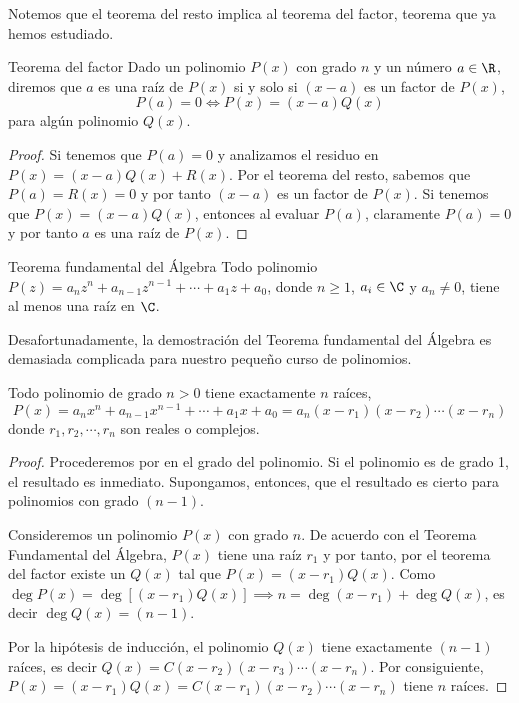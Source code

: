 Notemos que el teorema del resto implica al teorema del factor, teorema que ya hemos estudiado.

\begin{theorem.tcb}{Teorema del factor}{}
    Dado un polinomio $P(x)$ con grado $n$ y un número $a \in \R$, diremos que $a$ es una raíz de $P(x)$ si y solo si $(x - a)$ es un factor de $P(x)$, \ie
    \[
        P(a) = 0 \iff P(x) = (x - a)Q(x)
    \]
    para algún polinomio $Q(x)$.
\end{theorem.tcb}
\begin{proof}
    Si tenemos que $P(a) = 0$ y analizamos el residuo en $P(x) = (x - a)Q(x) + R(x)$.
    Por el teorema del resto, sabemos que $P(a) = R(x) = 0$ y por tanto $(x - a)$ es un factor de $P(x)$.
    Si tenemos que $P(x) = (x - a)Q(x)$, entonces al evaluar $P(a)$, claramente $P(a) = 0$ y por tanto $a$ es una raíz de $P(x)$.
\end{proof}

\begin{theorem.tcb}{Teorema fundamental del Álgebra}{}
    Todo polinomio $P(z) = a_n z^n + a_{n - 1} z^{n - 1} + \cdots + a_1 z + a_0$, donde $n \geq 1$, $a_i \in \C$ y $a_n \neq 0$, tiene al menos una raíz en $\C$.
\end{theorem.tcb}

Desafortunadamente, la demostración del Teorema fundamental del Álgebra es demasiada complicada para nuestro pequeño curso de polinomios.

\begin{theorem.tcb}{}{}
    Todo polinomio de grado $n > 0$ tiene exactamente $n$ raíces, \ie
    \[
        P(x) = a_n x^n + a_{n - 1} x^{n - 1} + \cdots  + a_1 x + a_0 = a_n (x - r_1)(x - r_2) \cdots (x - r_n)
    \]
    donde $r_1, r_2, \cdots, r_n$ son reales o complejos.
\end{theorem.tcb}
\begin{proof}
    Procederemos por  en el grado del polinomio.
    Si el polinomio es de grado 1, el resultado es inmediato.
    Supongamos, entonces, que el resultado es cierto para polinomios con grado $(n - 1)$.

    Consideremos un polinomio $P(x)$ con grado $n$.
    De acuerdo con el Teorema Fundamental del Álgebra, $P(x)$ tiene una raíz $r_1$ y por tanto, por el teorema del factor existe un $Q (x)$ tal que $P(x) = (x - r_1)Q(x)$.
    Como $\deg P(x) = \deg[(x - r_1)Q(x)] \implies n = \deg(x - r_1) + \deg Q(x)$, es decir $\deg Q(x) = (n - 1)$.

    Por la hipótesis de inducción, el polinomio $Q(x)$ tiene exactamente $(n - 1)$ raíces, es decir $Q(x) = C(x - r_2)(x - r_3)\cdots(x - r_n)$.
    Por consiguiente, $P(x) = (x - r_1)Q(x) = C(x - r_1)(x - r_2)\cdots(x - r_n)$ tiene $n$ raíces.
\end{proof}

